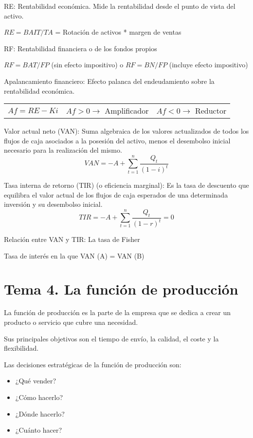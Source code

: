 \documentclass[12pt, twoside, openright]{report} %
\begin{document}
RE: Rentabilidad económica. Mide la rentabilidad desde el punto de vista del activo.

$RE = BAIT / TA$ = Rotación de activos * margen de ventas

RF: Rentabilidad financiera o de los fondos propios

$RF = BAT / FP$ (sin efecto impositivo) o $RF = BN / FP$ (incluye efecto impositivo)

Apalancamiento financiero: Efecto palanca del endeudamiento sobre la rentabilidad económica.
\begin{table}[H]
	\begin{tabular}{lll}
		$Af = RE - Ki$ & $Af > 0 \rightarrow$ Amplificador & $Af < 0 \rightarrow$ Reductor
	\end{tabular}
\end{table}


Valor actual neto (VAN): Suma algebraica de los valores actualizados de todos los flujos de caja asociados a
la posesión del activo, menos el desembolso inicial necesario para la realización del mismo.
$$VAN = -A + \sum\limits_{t=1}^n \frac{Q_t}{(1-i)^t}$$

Tasa interna de retorno (TIR) (o eficiencia marginal): Es la tasa de descuento que equilibra el valor actual de
los flujos de caja esperados de una determinada inversión y su desembolso inicial.
$$TIR = -A + \sum\limits_{t=1}^n \frac{Q_t}{(1-r)^t}=0$$

Relación entre VAN y TIR: La tasa de Fisher

Tasa de interés en la que VAN (A) = VAN (B)



\chapter{Tema 4. La función de producción}
La función de producción es la parte de la empresa que se dedica a crear un producto o servicio que cubre una necesidad.

Sus principales objetivos son el tiempo de envío, la calidad, el coste y la flexibilidad.

Las decisiones estratégicas de la función de producción son:
\begin{itemize}
	\item ¿Qué vender?
	\item ¿Cómo hacerlo?
	\item ¿Dónde hacerlo?
	\item ¿Cuánto hacer?
\end{itemize}
\end{document}
